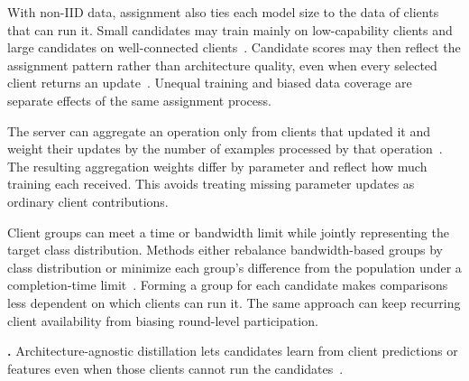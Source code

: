With non-IID data, assignment also ties each model size to the data of clients that can run it. Small candidates may train mainly on low-capability clients and large candidates on well-connected clients~\cite{fedoras_2022}. Candidate scores may then reflect the assignment pattern rather than architecture quality, even when every selected client returns an update~\cite{hapfnas_2025}. Unequal training and biased data coverage are separate effects of the same assignment process.

 The server can aggregate an operation only from clients that updated it and weight their updates by the number of examples processed by that operation~\cite{fedoras_2022,fgfl_2024,supernet_trade-off_fednas_2025}. The resulting aggregation weights differ by parameter and reflect how much training each received. This avoids treating missing parameter updates as ordinary client contributions.

 Client groups can meet a time or bandwidth limit while jointly representing the target class distribution. Methods either rebalance bandwidth-based groups by class distribution or minimize each group's difference from the population under a completion-time limit~\cite{network_aware_fed_nas_2025,finch_2024}. Forming a group for each candidate makes comparisons less dependent on which clients can run it. The same approach can keep recurring client availability from biasing round-level participation.

\noindent\textbf{.} Architecture-agnostic distillation lets candidates learn from client predictions or features even when those clients cannot run the candidates~\cite{hapfnas_2025,collaborative_nas_for_pfl_2025}.
